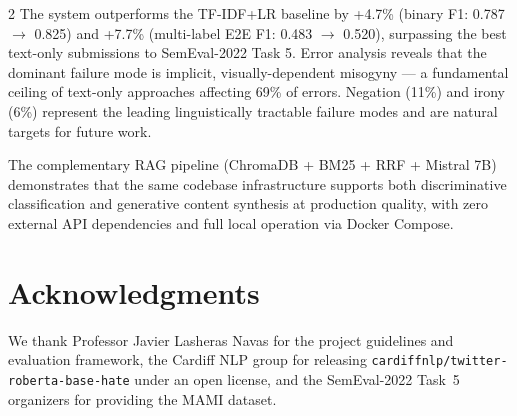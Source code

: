 \documentclass[11pt]{article}
\begin{document}
\begin{multicols}{2}
The system outperforms the TF-IDF+LR baseline by +4.7\% (binary F1: 0.787 $\rightarrow$ 0.825) and +7.7\% (multi-label E2E F1: 0.483 $\rightarrow$ 0.520), surpassing the best text-only submissions to SemEval-2022 Task 5. Error analysis reveals that the dominant failure mode is implicit, visually-dependent misogyny — a fundamental ceiling of text-only approaches affecting 69\% of errors. Negation (11\%) and irony (6\%) represent the leading linguistically tractable failure modes and are natural targets for future work.

The complementary RAG pipeline (ChromaDB + BM25 + RRF + Mistral 7B) demonstrates that the same codebase infrastructure supports both discriminative classification and generative content synthesis at production quality, with zero external API dependencies and full local operation via Docker Compose.

\section*{Acknowledgments}

We thank Professor Javier Lasheras Navas for the project guidelines and evaluation framework, the Cardiff NLP group for releasing \texttt{cardiffnlp/}\allowbreak\texttt{twitter-roberta-base-hate} under an open license, and the SemEval-2022 Task~5 organizers for providing the MAMI dataset.

\end{multicols}
\end{document}
